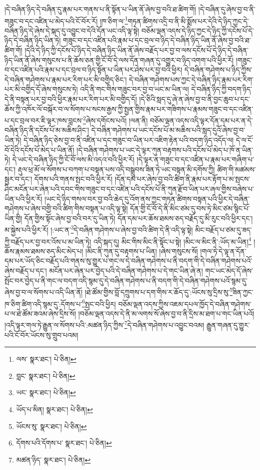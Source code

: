 །དེ་བཞིན་ཉིད་དེ་བཞིན་དུ་རྣམ་པར་གནས་པ་ནི་སྟོན་པ་ཡིན་ནོ་ཞེས་བྱ་བའི་ཐ་ཚིག་གོ། །དེ་བཞིན་དུ་ཞེས་བྱ་བ་ནི་གཟུང་བ་དང་འཛིན་པ་མེད་པའི་ངོ་བོར་རོ། །ཁ་ཅིག་ལ་\footnote{ལས་  སྣར་ཐང་།  པེ་ཅིན། }གཏན་ཚིགས་འདྲི་བ་ནི་མི་སྨོས་པར་དེའི་དེ་ཉིད་ཀྱང་དེ་བཞིན་ཉིད་དེ་ཞེས་དེ་སྐད་དུ་འབྱུང་བ་དེའི་དོན་ཡང་འདི་ལྟ་སྟེ། བཅོམ་ལྡན་འདས་དེ་ཉིད་ཀྱང་དེ་ཉིད་ཀྱི་དངོས་པོ་དེ་ཉིད་དེ་བཞིན་ཉིད་ཡིན་ཏེ། གཟུང་བ་དང་འཛིན་པའི་རྣམ་པ་དང་བྲལ་བ་ཉིད་དེ་བཞིན་ཉིད་ཡིན་ནོ་ཞེས་བྱ་བའི་ཐ་ཚིག་གོ། །དེའི་དེ་ཉིད་ཀྱི་དངོས་པོ་ཉིད་དེ་བཞིན་ཉིད་ཡིན་ནོ་ཞེས་བརྗོད་པར་བྱ་བ་ལས་དངོས་པོ་དེ་ཉིད་དེ་བཞིན་ཉིད་ཡིན་ནོ་ཞེས་གསུངས་པ་ནི་ཆོས་ཅན་གྱི་ངོ་བོ་དེ་ལས་དོན་གཞན་དུ་འགྱུར་བ་ཉིད་འགག་པའི་ཕྱིར་རོ། །གཟུང་བ་དང་འཛིན་པའི་རྣམ་པ་དང་བྲལ་བ་ཉིད་སྟོན་པ་ཡིན་པར་ཤེས་པར་བྱ་བའི་ཕྱིར། དེ་བཞིན་གཤེགས་པ་ཉིད་ཀྱིས་དེ་བཞིན་གཤེགས་པ་རྣམ་པར་རིག་པར་མི་བགྱིད་ཅིང་། དེ་བཞིན་གཤེགས་པས་ཀྱང་དེ་བཞིན་ཉིད་རྣམ་པར་རིག་པར་མི་བགྱིད་དོ་ཞེས་གསུངས་ཏེ། འདི་ནི་གང་གིས་གཟུང་བར་བྱ་བ་ཡང་མ་ཡིན་ལ། དེ་བཞིན་ཉིད་ཀྱི་བདག་ཉིད་དེ་ནི་བསྟན་པར་བྱ་བའི་ཕྱིར་རྣམ་པར་རིག་པར་མི་བགྱིད་དོ། །དེ་ཅིའི་སླད་དུ་ཞེ་ན་ཞེས་བྱ་བ་ནི་བྱང་ཆུབ་པ་དང་ཆོས་ཀྱི་འཁོར་ལོ་བསྐོར་བ་ལ་སོགས་པ་སངས་རྒྱས་ཀྱི་སྤྱན་གྱིས་རྣམ་པར་གཟིགས་པ་རྣམས་གཟུང་བ་དང་འཛིན་པ་དང་བྲལ་བར་ཇི་ལྟར་ཁས་བླངས་\footnote{བླང་  སྣར་ཐང་།  པེ་ཅིན། }ཞེས་དགོངས་པའོ། །ལན་ནི། བཅོམ་ལྡན་འདས་འདི་ལྟར་དོན་དམ་པར་ན་དེ་བཞིན་ཉིད་ནི་དངོས་པོ་མ་མཆིས་ཤིང་། དེ་བཞིན་གཤེགས་པ་ཡང་དངོས་པོ་མ་མཆིས་པའི་སླད་དུའོ་ཞེས་བྱ་བ་ཡིན་ཏེ། དེ་བཞིན་ཉིད་ཅེས་བྱ་བ་ནི་འཛིན་པ་དང་གཟུང་བ་ཡིན་པར་འཇིག་རྟེན་པའི་བདག་ཉིད་འདོད་ལ། དེ་ལ་ངོ་བོ་དེའི་དངོས་པོ་མེད་པ་ཡིན་ནོ། །དེ་བཞིན་གཤེགས་པ་ཡང་དེ་ལྟར་ཀུན་བརྟགས་པའི་དངོས་པོ་མེད་པ་ཁོ་ན་ཡིན་ཏེ། དེ་ཡང་དེ་བཞིན་ཉིད་ཀྱི་ངོ་བོ་ལས་མི་འདའ་བའི་ཕྱིར་རོ། །དེ་ལྟར་ན་གཟུང་བ་དང་འཛིན་པ་རྣམ་པར་གཞིག་པ་དང་། རྡུལ་ཕྲ་མོ་ལ་སོགས་པ་བཀག་པ་བསྟན་པས་འདི་བསྒྲུབས་ཟིན་ཏེ་ཡང་བསྟན་མི་དགོས་ཀྱི། ཚིག་གི་མཚམས་སྦྱར་བ་དང་། དོགས་པའི་གནས་སྤང་བའི་ཕྱིར་རོ། །དོན་དམ་པར་ཞེས་བྱ་བའི་ཚིག་ནི་རྣམ་པར་རྟོག་པ་མ་སྤངས་ཤིང་མངོན་པར་ཞེན་པའི་དབང་གིས་གཟུང་བ་དང་འཛིན་པའི་དངོས་པོ་ནི་ཀུན་རྫོབ་ཡིན་པར་ཞལ་གྱིས་བཞེས་པ་ཡིན་པའི་ཕྱིར་རོ། །ཡང་དེ་ཉིད་གསལ་བར་བྱ་བའི་ཆེད་དུ་འོག་ནས་ཀྱང་གཏན་ཚིགས་བསྟན་པའི་ཕྱིར་དེ་བཞིན་གཤེགས་པ་ཞེས་བགྱི་བའི་ཚིག་གིས་བསྟན་པ་འདི་ལྟ་སྟེ། དོན་གྱི་ངོ་བོ་དེ་ནི་མིང་ཙམ་དུ་བས་ཏེ་མིང་ཙམ་སྙིང་པོ་ཡིན་གྱི། དོན་གྱིས་སྟོང་ཞེས་བྱ་བའི་བར་དུ་ཡིན་ཏེ། དོན་དམ་པར་ཆོས་ཐམས་ཅད་བརྗོད་དུ་མི་རུང་བའི་ཕྱིར་དང་། མ་སྐྱེས་པའི་ཕྱིར་རོ། །:ཡང་ན་\footnote{ཡང་  སྣར་ཐང་།  པེ་ཅིན། }དེ་བཞིན་གཤེགས་པ་ཞེས་བྱ་བའི་ཚིག་དེ་ནི་འདི་ལྟ་སྟེ། མིང་བརྗོད་པ་ཙམ་དུ་ཟད་ཀྱི་བརྗོད་པར་བྱ་བར་འོས་པ་མ་ཡིན་ཏེ། འདི་སྐད་དུ། མིང་གིས་མིང་ནི་སྟོང་པ་སྟེ། །མིང་ལ་མིང་ནི་:ཡོད་མ་ཡིན།\footnote{ཡོད་པ་མིན།  སྣར་ཐང་།  པེ་ཅིན། } །ཆོས་རྣམས་ཐམས་ཅད་མིང་མེད་པ། །མིང་ནི་ཀུན་དུ་བརྟགས་པ་ཡིན། །ཞེས་གསུངས་སོ། །གལ་ཏེ་དེ་ལྟ་ན་དོན་དམ་པར་ཡོད་ཅིང་བརྗོད་པའི་གནས་སུ་གྱུར་པ་གང་ལ་དེ་བཞིན་གཤེགས་པ་ནི་བདག་གི་དེ་བཞིན་གཤེགས་པའོ་ཞེས་བརྗོད་པ་དང་། མངོན་པར་ཞེན་པར་བྱེད་པའི་དེ་བཞིན་གཤེགས་པ་དེ་གང་ཡིན་ཞེ་ན། གང་ཡང་མེད་དོ་ཞེས་སྤོང་བར་བྱེད་པ་ནི་གང་ལ་བདག་འདི་སྙམ་དུ་དེ་བཞིན་གཤེགས་པ་ནི་བདག་གི་དེ་བཞིན་གཤེགས་པའོ་སྙམ་དུ་ཞེས་བྱ་བ་ལ་སོགས་པ་འདི་ཡིན་ནོ། །ཐེ་ཚོམ་གྱིས་བློ་དཀྲུགས་པ་དག་གིས་ར་ཆོད་དུ་:ཡོངས་སུ་དྲིས་སུ་\footnote{ཡོངས་སུ་  སྣར་ཐང་།  པེ་ཅིན། }ཟིན་ཀྱང་ཁ་ཅིག་ཚིག་འདི་སྙམ་དུ་:དོགས་པ་\footnote{དོགས་པའི་དོགས་པ་  སྣར་ཐང་།  པེ་ཅིན། }སྤང་བའི་ཕྱིར། བཅོམ་ལྡན་འདས་ཀྱིས་འཇམ་དཔལ་ཁྱོད་དེ་བཞིན་གཤེགས་པ་ལ་ཐེ་ཚོམ་ཟའམ་ཞེས་དྲིས་སོ། །བཅོམ་ལྡན་འདས་དེ་ནི་མ་ལགས་སོ་ཞེས་བྱ་བ་ནི་དྲིས་མ་ཐག་པ་གང་ཡིན་པའོ། །འདི་ལྟར་གལ་ཏེ་རྒྱུན་ལ་སོགས་པའི་:མཚན་ཉིད་ཀྱིས་\footnote{མཚན་ཉིད་  སྣར་ཐང་།  པེ་ཅིན། }དེ་བཞིན་གཤེགས་པ་འབྱུང་བའམ། རྒྱུན་གཞན་དུ་གྱུར་པའི་ངོ་བོར་ཡོངས་སུ་གྲུབ་པའམ། 
